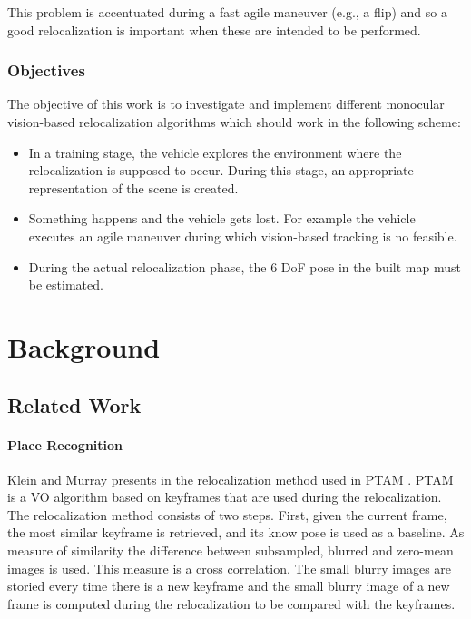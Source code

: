 This problem is accentuated during a fast  agile maneuver (e.g., a flip) and so a good relocalization is important when these are intended to be performed. \\

\subsection{Objectives}
\label{sub:objectives}

The objective of this work is to investigate and implement different monocular vision-based relocalization algorithms which should work in the following scheme:

\begin{itemize}
  \item In a training stage, the vehicle explores the environment where the relocalization is supposed to occur. During this stage, an appropriate representation of the scene is created. 
  \item Something happens and the vehicle gets lost. For example the vehicle executes an agile maneuver during which vision-based tracking is no feasible.
  \item During the actual relocalization phase, the 6 DoF pose in  the built map must be estimated.
\end{itemize}

\chapter{Background}
\label{cha:background}


\section{Related Work}\label{sec:related_work}

\subsubsection{Place Recognition}
\label{ssub:place_recognition}


Klein and Murray presents in \cite{Klein2008improving} the relocalization method used in PTAM \cite{KleinMurray2007}. PTAM is a VO algorithm based on keyframes that are used during the relocalization. The relocalization method consists of two steps. First, given the current frame, the most similar keyframe is retrieved, and its know pose is used as a baseline. As measure of similarity the difference between subsampled, blurred and zero-mean images is used. This measure is a cross correlation. The small blurry images are storied every time there is a new keyframe and the small blurry image of a new frame is computed during the relocalization to be compared with the keyframes.\\

